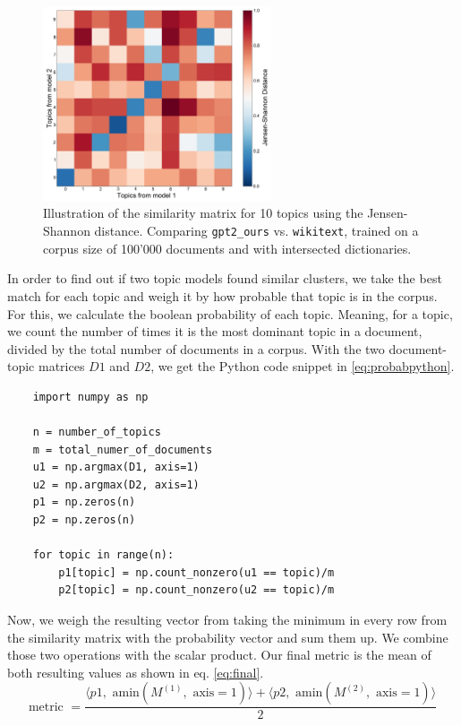 \begin{figure}[H]
    \centering
    \includegraphics[width=0.6\textwidth]{figures/diff_classic_lda_intersection_10}
    \caption{Illustration of the similarity matrix for 10 topics using the Jensen-Shannon distance. Comparing \texttt{gpt2\_ours} vs. \texttt{wikitext}, trained on a corpus size of 100'000 documents and with intersected dictionaries.}
    \label{fig:diff_classic_lda_intersection_10}
\end{figure}
In order to find out if two topic models found similar clusters, we take the best match for each topic and weigh it by how probable that topic is in the corpus. For this, we calculate the boolean probability of each topic. Meaning, for a topic, we count the number of times it is the most dominant topic in a document, divided by the total number of documents in a corpus. With the two document-topic matrices $D1$ and $D2$, we get the Python code snippet in \ref{eq:probabpython}.
\begin{code}
\label{eq:probabpython}
\begin{verbatim}
    import numpy as np
    
    n = number_of_topics
    m = total_numer_of_documents
    u1 = np.argmax(D1, axis=1)  
    u2 = np.argmax(D2, axis=1)
    p1 = np.zeros(n)
    p2 = np.zeros(n)
    
    for topic in range(n):
        p1[topic] = np.count_nonzero(u1 == topic)/m
        p2[topic] = np.count_nonzero(u2 == topic)/m
\end{verbatim}
\end{code}
Now, we weigh the resulting vector from taking the minimum in every row from the similarity matrix with the probability vector and sum them up. We combine those two operations with the scalar product. Our final metric is the mean of both resulting values as shown in eq. \ref{eq:final}.  
\begin{equation}\label{eq:final}
    \text{metric }=\frac{\langle p1,\text{ amin}(M^{(1)},\text{ axis}=1)\rangle + \langle p2,\text{ amin}(M^{(2)},\text{ axis}=1)\rangle}{2}
\end{equation}

